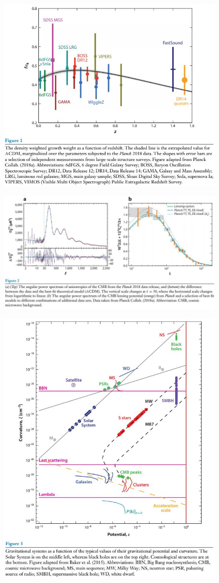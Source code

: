\begin{figure}[H]
    \centering
    \includegraphics[width=.75 \textwidth]{Pictures/99/ei2018-1.jpg}
\end{figure}
\begin{figure}[H]
    \centering
    \includegraphics[width=.86 \textwidth]{Pictures/99/ei2018-2.jpg}
\end{figure}
\begin{figure}[H]
    \centering
    \includegraphics[width=.75 \textwidth]{Pictures/99/ei2018-3.jpg}
\end{figure}

